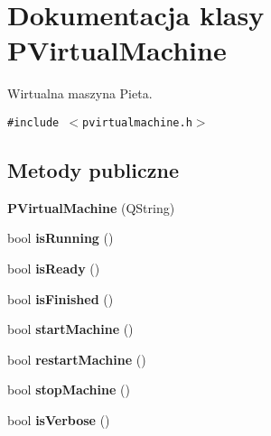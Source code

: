 \hypertarget{classPVirtualMachine}{
\section{Dokumentacja klasy PVirtualMachine}
\label{classPVirtualMachine}
}
Wirtualna maszyna Pieta.  


{\tt \#include $<$pvirtualmachine.h$>$}

\subsection*{Metody publiczne}
\begin{CompactItemize}
\item 
\hypertarget{classPVirtualMachine_0af0326622a3f47b6c2020413cdd3e05}{
\textbf{PVirtualMachine} (QString)}
\label{classPVirtualMachine_0af0326622a3f47b6c2020413cdd3e05}

\item 
\hypertarget{classPVirtualMachine_823195d3ae1615c791dfeb6c8d365a0e}{
bool \textbf{isRunning} ()}
\label{classPVirtualMachine_823195d3ae1615c791dfeb6c8d365a0e}

\item 
\hypertarget{classPVirtualMachine_5132bedd5e8480185b48ea6c4783c770}{
bool \textbf{isReady} ()}
\label{classPVirtualMachine_5132bedd5e8480185b48ea6c4783c770}

\item 
\hypertarget{classPVirtualMachine_6b19e3e51a584b13e79c44fc5b842c2b}{
bool \textbf{isFinished} ()}
\label{classPVirtualMachine_6b19e3e51a584b13e79c44fc5b842c2b}

\item 
\hypertarget{classPVirtualMachine_4b6bb128d63569e855684128b5e09f1c}{
bool \textbf{startMachine} ()}
\label{classPVirtualMachine_4b6bb128d63569e855684128b5e09f1c}

\item 
\hypertarget{classPVirtualMachine_f4cdf5d80b7a169e2dfdebffe2588e4b}{
bool \textbf{restartMachine} ()}
\label{classPVirtualMachine_f4cdf5d80b7a169e2dfdebffe2588e4b}

\item 
\hypertarget{classPVirtualMachine_fa30f1871832c1af18519db03c397ac0}{
bool \textbf{stopMachine} ()}
\label{classPVirtualMachine_fa30f1871832c1af18519db03c397ac0}

\item 
\hypertarget{classPVirtualMachine_219cd1d08de6d3d5a9117eecc5348d9c}{
bool \textbf{isVerbose} ()}
\label{classPVirtualMachine_219cd1d08de6d3d5a9117eecc5348d9c}


\end{CompactItemize}
